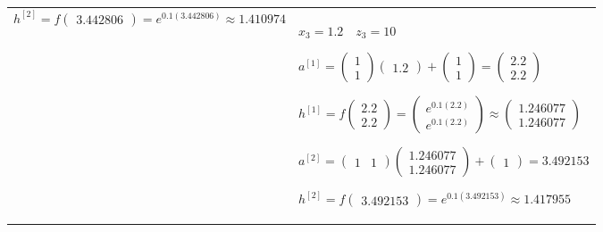 \documentclass[11pt,a4paper]{article}
\begin{document}
\begin{flushleft}
\begin{tabularx}{1.09\textwidth}{X X}
  $ h^{[2]} = f \begin{pmatrix} 3.442806 \end{pmatrix} = e^{0.1(3.442806)} \approx 1.410974 $ \par \vspace{1mm}
  & %
  $ \boxed{x_3 = 1.2} \quad z_3 = 10 $ \par \vspace{1mm}
  $ a^{[1]} = \begin{pmatrix} 1 \\ 1 \end{pmatrix} \begin{pmatrix} 1.2 \end{pmatrix} + \begin{pmatrix} 1 \\ 1 \end{pmatrix} = \begin{pmatrix} 2.2 \\ 2.2 \end{pmatrix} $ \par \vspace{1mm}
  $ h^{[1]} = f \begin{pmatrix} 2.2 \\ 2.2 \end{pmatrix} = \begin{pmatrix} e^{0.1(2.2)} \\ e^{0.1(2.2)} \end{pmatrix} \approx \begin{pmatrix} 1.246077 \\ 1.246077 \end{pmatrix} $ \par \vspace{1mm}
  $ a^{[2]} = \begin{pmatrix} 1 & 1 \end{pmatrix} \begin{pmatrix} 1.246077 \\ 1.246077 \end{pmatrix} + \begin{pmatrix} 1 \end{pmatrix} = 3.492153 $ \par \vspace{1mm}
  $ h^{[2]} = f \begin{pmatrix} 3.492153 \end{pmatrix} = e^{0.1(3.492153)} \approx 1.417955 $ \par \vspace{1mm}
\end{tabularx}


\end{flushleft}
\end{document}
